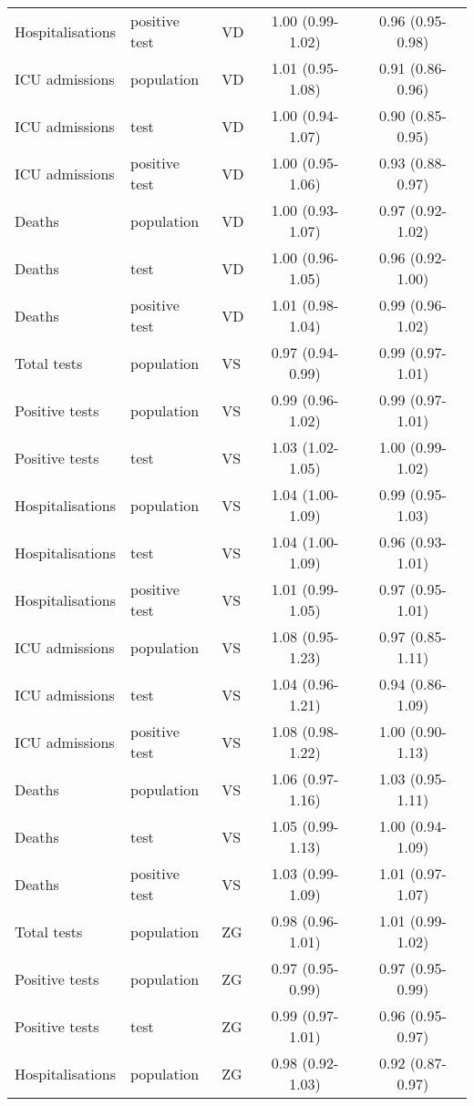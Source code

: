 \documentclass{article}
\begin{document}
\begin{longtable}{lllcc}
		Hospitalisations & positive test & VD & 1.00 (0.99-1.02) & 0.96 (0.95-0.98) \\ 
		ICU admissions & population & VD & 1.01 (0.95-1.08) & 0.91 (0.86-0.96) \\ 
		ICU admissions & test & VD & 1.00 (0.94-1.07) & 0.90 (0.85-0.95) \\ 
		ICU admissions & positive test & VD & 1.00 (0.95-1.06) & 0.93 (0.88-0.97) \\ 
		Deaths & population & VD & 1.00 (0.93-1.07) & 0.97 (0.92-1.02) \\ 
		Deaths & test & VD & 1.00 (0.96-1.05) & 0.96 (0.92-1.00) \\ 
		Deaths & positive test & VD & 1.01 (0.98-1.04) & 0.99 (0.96-1.02) \\ 
		Total tests & population & VS & 0.97 (0.94-0.99) & 0.99 (0.97-1.01) \\ 
		Positive tests & population & VS & 0.99 (0.96-1.02) & 0.99 (0.97-1.01) \\ 
		Positive tests & test & VS & 1.03 (1.02-1.05) & 1.00 (0.99-1.02) \\ 
		Hospitalisations & population & VS & 1.04 (1.00-1.09) & 0.99 (0.95-1.03) \\ 
		Hospitalisations & test & VS & 1.04 (1.00-1.09) & 0.96 (0.93-1.01) \\ 
		Hospitalisations & positive test & VS & 1.01 (0.99-1.05) & 0.97 (0.95-1.01) \\ 
		ICU admissions & population & VS & 1.08 (0.95-1.23) & 0.97 (0.85-1.11) \\ 
		ICU admissions & test & VS & 1.04 (0.96-1.21) & 0.94 (0.86-1.09) \\ 
		ICU admissions & positive test & VS & 1.08 (0.98-1.22) & 1.00 (0.90-1.13) \\ 
		Deaths & population & VS & 1.06 (0.97-1.16) & 1.03 (0.95-1.11) \\ 
		Deaths & test & VS & 1.05 (0.99-1.13) & 1.00 (0.94-1.09) \\ 
		Deaths & positive test & VS & 1.03 (0.99-1.09) & 1.01 (0.97-1.07) \\ 
		Total tests & population & ZG & 0.98 (0.96-1.01) & 1.01 (0.99-1.02) \\ 
		Positive tests & population & ZG & 0.97 (0.95-0.99) & 0.97 (0.95-0.99) \\ 
		Positive tests & test & ZG & 0.99 (0.97-1.01) & 0.96 (0.95-0.97) \\ 
		Hospitalisations & population & ZG & 0.98 (0.92-1.03) & 0.92 (0.87-0.97) \\ 

\end{longtable}
\end{document}
